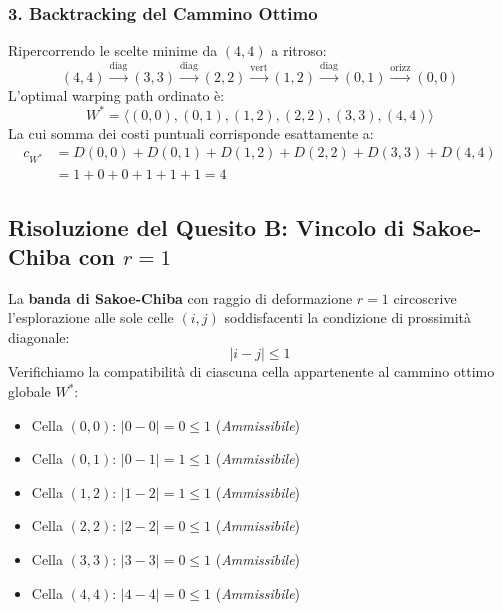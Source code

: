 \subsubsection{3. Backtracking del Cammino Ottimo}
Ripercorrendo le scelte minime da $(4,4)$ a ritroso:
\begin{equation}
(4,4) \xrightarrow{\text{diag}} (3,3) \xrightarrow{\text{diag}} (2,2) \xrightarrow{\text{vert}} (1,2) \xrightarrow{\text{diag}} (0,1) \xrightarrow{\text{orizz}} (0,0)
\end{equation}
L'optimal warping path ordinato \`e:
\begin{equation}
W^* = \langle (0,0), (0,1), (1,2), (2,2), (3,3), (4,4) \rangle
\end{equation}
La cui somma dei costi puntuali corrisponde esattamente a:
\begin{align*}
c_{W^*} &= D(0,0) + D(0,1) + D(1,2) + D(2,2) + D(3,3) + D(4,4) \\
&= 1 + 0 + 0 + 1 + 1 + 1 = 4
\end{align*}

\FloatBarrier
\subsection{Risoluzione del Quesito B: Vincolo di Sakoe-Chiba con $r=1$}
\label{subsec:ts-exercise-solution-b}

La \textbf{banda di Sakoe-Chiba} con raggio di deformazione $r=1$ circoscrive l'esplorazione alle sole celle $(i,j)$ soddisfacenti la condizione di prossimit\`a diagonale:
\begin{equation}
\label{eq:sakoe-chiba-condition}
|i - j| \le 1
\end{equation}
Verifichiamo la compatibilit\`a di ciascuna cella appartenente al cammino ottimo globale $W^*$:
\begin{itemize}
    \item Cella $(0,0)$: $|0 - 0| = 0 \le 1$ \quad (\textit{Ammissibile})
    \item Cella $(0,1)$: $|0 - 1| = 1 \le 1$ \quad (\textit{Ammissibile})
    \item Cella $(1,2)$: $|1 - 2| = 1 \le 1$ \quad (\textit{Ammissibile})
    \item Cella $(2,2)$: $|2 - 2| = 0 \le 1$ \quad (\textit{Ammissibile})
    \item Cella $(3,3)$: $|3 - 3| = 0 \le 1$ \quad (\textit{Ammissibile})
    \item Cella $(4,4)$: $|4 - 4| = 0 \le 1$ \quad (\textit{Ammissibile})
\end{itemize}

